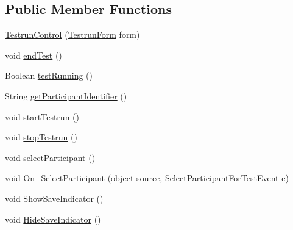 \subsection*{Public Member Functions}
\begin{DoxyCompactItemize}
\item 
\hyperlink{class_web_analyzer_1_1_u_i_1_1_interaction_objects_1_1_testrun_control_a4c7cc1fb505c57b84d0247abb85eb424}{Testrun\+Control} (\hyperlink{class_web_analyzer_1_1_u_i_1_1_testrun_form}{Testrun\+Form} form)
\item 
void \hyperlink{class_web_analyzer_1_1_u_i_1_1_interaction_objects_1_1_testrun_control_afa240c157d4dca3e5399625cf59afd8c}{end\+Test} ()
\item 
Boolean \hyperlink{class_web_analyzer_1_1_u_i_1_1_interaction_objects_1_1_testrun_control_ae1dacc2d3e11d88116b3dbf9c45ea403}{test\+Running} ()
\item 
String \hyperlink{class_web_analyzer_1_1_u_i_1_1_interaction_objects_1_1_testrun_control_a91ae8944392f8e0aef79106e157091a6}{get\+Participant\+Identifier} ()
\item 
void \hyperlink{class_web_analyzer_1_1_u_i_1_1_interaction_objects_1_1_testrun_control_af27f7dfe9f65ab63b139bc58873eb689}{start\+Testrun} ()
\item 
void \hyperlink{class_web_analyzer_1_1_u_i_1_1_interaction_objects_1_1_testrun_control_a5f0c295b6abbeade6416f7a8fec63d70}{stop\+Testrun} ()
\item 
void \hyperlink{class_web_analyzer_1_1_u_i_1_1_interaction_objects_1_1_testrun_control_ad6ef95e986f389417a22a36b6e95ef36}{select\+Participant} ()
\item 
void \hyperlink{class_web_analyzer_1_1_u_i_1_1_interaction_objects_1_1_testrun_control_aa6efe805f8e05a4fb701e214d8e53bec}{On\+\_\+\+Select\+Participant} (\hyperlink{_u_i_2_h_t_m_l_resources_2js_2lib_2underscore_8min_8js_aae18b7515bb2bc4137586506e7c0c903}{object} source, \hyperlink{class_web_analyzer_1_1_events_1_1_select_participant_for_test_event}{Select\+Participant\+For\+Test\+Event} \hyperlink{_u_i_2_h_t_m_l_resources_2js_2lib_2bootstrap_8min_8js_ab5902775854a8b8440bcd25e0fe1c120}{e})
\item 
void \hyperlink{class_web_analyzer_1_1_u_i_1_1_interaction_objects_1_1_testrun_control_a63c62507fe21c9a5af3ec6fcef4072d3}{Show\+Save\+Indicator} ()
\item 
void \hyperlink{class_web_analyzer_1_1_u_i_1_1_interaction_objects_1_1_testrun_control_a607f5823a334e7a7bed326085fb65bc6}{Hide\+Save\+Indicator} ()
\end{DoxyCompactItemize}
